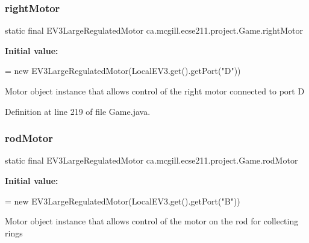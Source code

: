 \mbox{\label{enumca_1_1mcgill_1_1ecse211_1_1project_1_1_game_a7a05fcf37c4435c32270776a427ba0d2}} 
\subsubsection{\texorpdfstring{right\+Motor}{rightMotor}}
{\footnotesize\ttfamily  static  final E\+V3\+Large\+Regulated\+Motor ca.\+mcgill.\+ecse211.\+project.\+Game.\+right\+Motor\hspace{0.3cm}{\ttfamily [static]}}

{\bfseries Initial value\+:}
\begin{DoxyCode}
=
      \textcolor{keyword}{new} EV3LargeRegulatedMotor(LocalEV3.get().getPort(\textcolor{stringliteral}{"D"}))
\end{DoxyCode}
Motor object instance that allows control of the right motor connected to port D 

Definition at line 219 of file Game.\+java.

\mbox{\label{enumca_1_1mcgill_1_1ecse211_1_1project_1_1_game_abc070af2fa5a5cda6d81977b35aacfb4}} 
\subsubsection{\texorpdfstring{rod\+Motor}{rodMotor}}
{\footnotesize\ttfamily  static  final E\+V3\+Large\+Regulated\+Motor ca.\+mcgill.\+ecse211.\+project.\+Game.\+rod\+Motor\hspace{0.3cm}{\ttfamily [static]}}

{\bfseries Initial value\+:}
\begin{DoxyCode}
=
      \textcolor{keyword}{new} EV3LargeRegulatedMotor(LocalEV3.get().getPort(\textcolor{stringliteral}{"B"}))
\end{DoxyCode}
Motor object instance that allows control of the motor on the rod for collecting rings 

